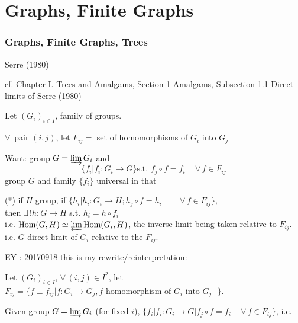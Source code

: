 \part{Graphs, Finite Graphs}


\section{Graphs, Finite Graphs, Trees }

Serre (1980) \cite{agat:Serr1980}  

cf. Chapter I. Trees and Amalgams, Section 1 Amalgams, Subsection 1.1 Direct limits of Serre (1980) \cite{agat:Serr1980}  


Let $(G_i)_{i\in I}$, family of groups.    

$\forall \, $ pair $(i,j)$, let $F_{ij} = $ set of homomorphisms of $G_i$ into $G_j$

Want: group $G= \varinjlim G_i$ and 
\[
\lbrace f_i | f_i : G_i \to G \rbrace \text{s.t. } f_j \circ f = f_i \quad \, \forall \, f \in F_{ij}
\]
group $G$ and family $\lbrace f_i\rbrace$ universal in that  

(*) if $H$ group, if $\lbrace h_i | h_i :G_i \to H ; h_j \circ f = h_i \qquad \, \forall \, f \in F_{ij} \rbrace$, \\
then $\exists \, ! h: G\to H$ s.t. $h_i = h\circ f_i$  \\
i.e. $\text{Hom}(G,H) \simeq \varprojlim \text{Hom}(G_i,H)$, the inverse limit being taken relative to $F_{ij}$.  \\
i.e. $G$ direct limit of $G_i$ relative to the $F_{ij}$.  

EY : 20170918 this is my rewrite/reinterpretation:

Let $(G_i)_{i\in I}$, $\forall \, (i,j) \in I^2$, let $F_{ij} = \lbrace f \equiv f_{ij} | f:G_i \to G_j , f \text{ homomorphism of $G_i$ into $G_j$ } \rbrace$.  

Given group $G = \varinjlim G_i$ (for fixed $i$), $\lbrace f_i | f_i : G_i \to G  |  f_j \circ f = f_i \quad \, \forall \, f \in F_{ij} \rbrace$, i.e.  


